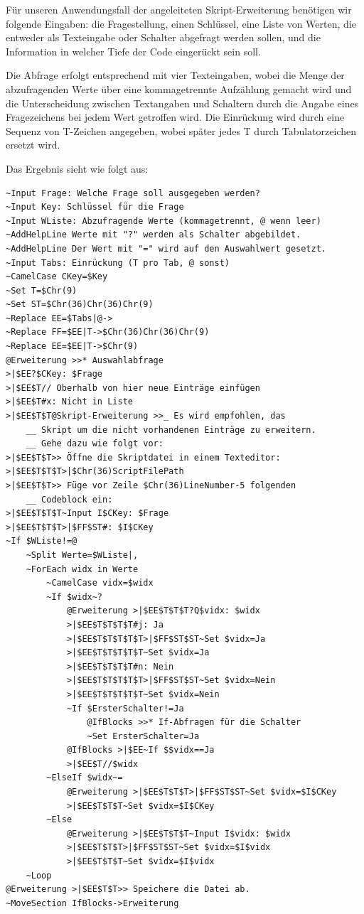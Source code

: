 Für unseren Anwendungsfall der angeleiteten Skript-Erweiterung benötigen wir folgende Eingaben: die Fragestellung, einen Schlüssel, eine Liste von Werten, die entweder als Texteingabe oder Schalter abgefragt werden sollen, und die Information in welcher Tiefe der Code eingerückt sein soll.

Die Abfrage erfolgt entsprechend mit vier Texteingaben, wobei die Menge der abzufragenden Werte über eine kommagetrennte Aufzählung gemacht wird und die Unterscheidung zwischen Textangaben und Schaltern durch die Angabe eines Fragezeichens bei jedem Wert getroffen wird. Die Einrückung wird durch eine Sequenz von T-Zeichen angegeben, wobei später jedes T durch Tabulatorzeichen ersetzt wird.

Das Ergebnis sieht wie folgt aus:

\label{BspMetaErweiterung}
\begin{verbatim}
~Input Frage: Welche Frage soll ausgegeben werden?
~Input Key: Schlüssel für die Frage
~Input WListe: Abzufragende Werte (kommagetrennt, @ wenn leer)
~AddHelpLine Werte mit "?" werden als Schalter abgebildet.
~AddHelpLine Der Wert mit "=" wird auf den Auswahlwert gesetzt.
~Input Tabs: Einrückung (T pro Tab, @ sonst)
~CamelCase CKey=$Key
~Set T=$Chr(9)
~Set ST=$Chr(36)Chr(36)Chr(9)
~Replace EE=$Tabs|@->
~Replace FF=$EE|T->$Chr(36)Chr(36)Chr(9)
~Replace EE=$EE|T->$Chr(9)
@Erweiterung >>* Auswahlabfrage
>|$EE?$CKey: $Frage
>|$EE$T// Oberhalb von hier neue Einträge einfügen
>|$EE$T#x: Nicht in Liste
>|$EE$T$T@Skript-Erweiterung >>_ Es wird empfohlen, das
    __ Skript um die nicht vorhandenen Einträge zu erweitern.
    __ Gehe dazu wie folgt vor:
>|$EE$T$T>> Öffne die Skriptdatei in einem Texteditor:
>|$EE$T$T$T>|$Chr(36)ScriptFilePath
>|$EE$T$T>> Füge vor Zeile $Chr(36)LineNumber-5 folgenden
    __ Codeblock ein:
>|$EE$T$T$T~Input I$CKey: $Frage
>|$EE$T$T$T>|$FF$ST#: $I$CKey
~If $WListe!=@
    ~Split Werte=$WListe|,
    ~ForEach widx in Werte
        ~CamelCase vidx=$widx
        ~If $widx~?
            @Erweiterung >|$EE$T$T$T?Q$vidx: $widx
            >|$EE$T$T$T$T#j: Ja
            >|$EE$T$T$T$T$T>|$FF$ST$ST~Set $vidx=Ja
            >|$EE$T$T$T$T$T~Set $vidx=Ja
            >|$EE$T$T$T$T#n: Nein
            >|$EE$T$T$T$T$T>|$FF$ST$ST~Set $vidx=Nein
            >|$EE$T$T$T$T$T~Set $vidx=Nein
            ~If $ErsterSchalter!=Ja
                @IfBlocks >>* If-Abfragen für die Schalter
                ~Set ErsterSchalter=Ja
            @IfBlocks >|$EE~If $$vidx==Ja
            >|$EE$T//$widx
        ~ElseIf $widx~=
            @Erweiterung >|$EE$T$T$T>|$FF$ST$ST~Set $vidx=$I$CKey
            >|$EE$T$T$T~Set $vidx=$I$CKey
        ~Else            
            @Erweiterung >|$EE$T$T$T~Input I$vidx: $widx
            >|$EE$T$T$T>|$FF$ST$ST~Set $vidx=$I$vidx
            >|$EE$T$T$T~Set $vidx=$I$vidx
    ~Loop
@Erweiterung >|$EE$T$T>> Speichere die Datei ab.
~MoveSection IfBlocks->Erweiterung
\end{verbatim}

